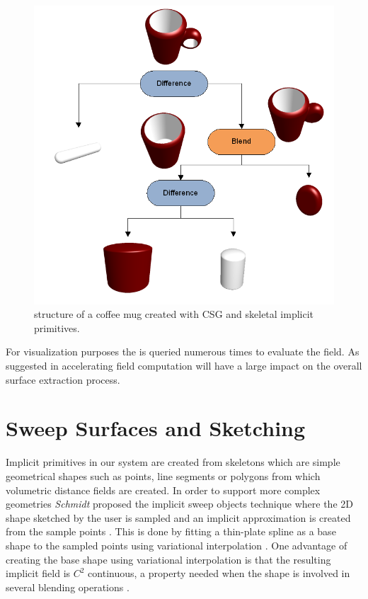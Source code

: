 \begin{figure}[H]
\centering
  \includegraphics[width=1.0\linewidth]{figures/intro/CoffeeMugBlobTree}
  \caption{\blob structure of a coffee mug created with CSG and skeletal implicit primitives.}
  \label{fig:CoffeeMugBlobTree}
\end{figure}

For visualization purposes the \blob is queried numerous times to evaluate the field. As suggested in \cite{SWG2005} 
accelerating field computation will have a large impact on the overall surface extraction process. 

\section{Sweep Surfaces and Sketching}
Implicit primitives in our system are created from skeletons which are simple geometrical shapes such as points, line segments or 
polygons from which volumetric distance fields are created. In order to support more complex geometries \textit{Schmidt} \etal proposed the
implicit sweep objects technique where the 2D shape sketched by the user is sampled and an implicit approximation is created from 
the sample points \cite{Schmidtc}. This is done by fitting a thin-plate spline as a base shape to the sampled points using variational 
interpolation \cite{Turk1999}. One advantage of creating the base shape using variational interpolation is that the resulting implicit 
field is $C^2$ continuous, a property needed when the shape is involved in several blending operations \cite{barthe2004controllable}.


